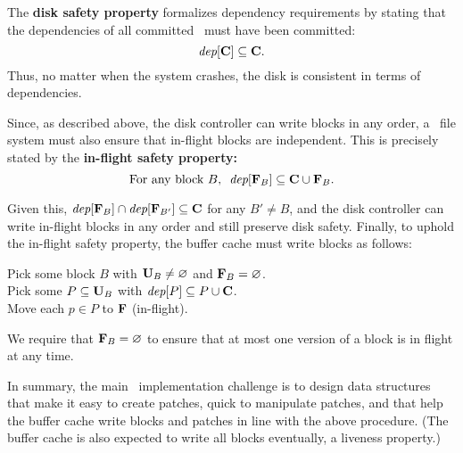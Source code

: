 The \textbf{disk safety property} formalizes dependency requirements by
 stating that the dependencies of all committed \patches\ must have been
 committed:
%
\[ \PDepset{\PDisk} \subseteq \PDisk. \]
%
Thus, no matter when the system crashes, the disk is consistent in terms of
dependencies.
%
%
\begin{comment}
 However, \Kudos\ can only control when \patches\ are handed to the disk
 controller, not when they are written to disk.
 Disk controller behavior is encapsulated in the following atomic action:

 \begin{tabbing}
 \textit{Commit block:} \\
 \quad Pick some block $b$ with $\PInf[b] \neq \emptyset$. \\
 \quad Move each $p \in \PInf[b]$ to $\PDisk$ (committed).
 \end{tabbing}
\end{comment}
%
Since, as described above, the disk controller can write blocks in any
 order, a \Kudos\ file system must also ensure
that in-flight blocks are independent.  This is precisely stated
by the \textbf{in-flight safety property:}
%
\[ \text{For any block $B$,~~} \PDepset{\PInf[B]} \subseteq \PDisk \cup \PInf[B] . \]
%
\begin{comment}
(The union with $\PInf[B]$ is necessary for the case of multiple in-flight
\patches\ on the same block.)
\end{comment}
%
Given this, $\PDepset{\PInf[B]} \cap \PDepset{\PInf[B']} \subseteq \PDisk$ for
 any $B' \neq B$, and the disk controller can write in-flight blocks
 in any order and still preserve disk safety.
%
Finally, to uphold the in-flight safety property, the buffer cache must
 write blocks as follows:
%
\begin{tabbing}
\quad \quad Pick some block $B$ with $\PMem[B] \neq \emptyset$ and $\PInf[B] =
\emptyset$. \\
\quad \quad Pick some $P \subseteq \PMem[B]$ with $\PDepset{P} \subseteq P \cup
\PDisk$. \\
\quad \quad Move each $p \in P$ to $\PInf$ (in-flight).
\end{tabbing}
%
\noindent
%
We require that $\PInf[B] = \emptyset$ to ensure that at most one version of
 a block is in flight at any time.

In summary, the main \Featherstitch\ implementation challenge is to design
 data structures that make it easy to create patches, quick to manipulate
 patches, and that help the buffer cache write blocks and patches in line
 with the above procedure.
%
(The buffer cache is also expected to write all blocks eventually, a
 liveness property.)


